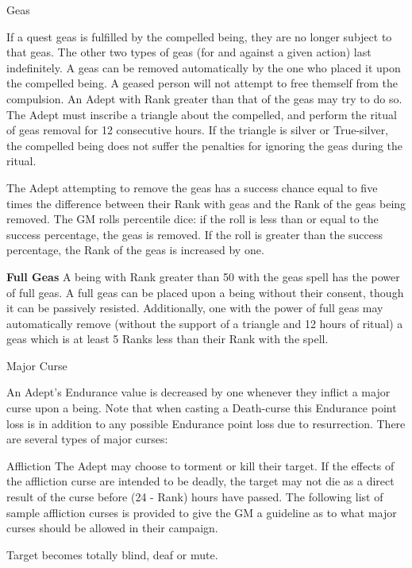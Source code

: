 \begin{multicols}{3}
\begin{spell}[]{Geas}
\begin{effects}
If a quest geas is fulfilled by the compelled being, they are no
longer subject to that geas.  The other two types of geas (for and
against a given action) last indefinitely.  A geas can be removed
automatically by the one who placed it upon the compelled being.  A
geased person will not attempt to free themself from the compulsion.
An Adept with Rank greater than that of the geas may try to do so.
The Adept must inscribe a triangle about the compelled, and perform
the ritual of geas removal for 12 consecutive hours.  If the triangle
is silver or True-silver, the compelled being does not suffer the
penalties for ignoring the geas during the ritual.

The Adept attempting to remove the geas has a success chance equal to
five times the difference between their Rank with geas and the Rank of
the geas being removed.  The GM rolls percentile dice: if the roll is
less than or equal to the success percentage, the geas is removed. If
the roll is greater than the success percentage, the Rank of the geas
is increased by one.

\textbf{Full Geas} A being with Rank greater than 50 with the geas
spell has the power of full geas. A full geas can be placed upon a
being without their consent, though it can be passively resisted.
Additionally, one with the power of full geas may automatically remove
(without the support of a triangle and 12 hours of ritual) a geas
which is at least 5 Ranks less than their Rank with the spell.
\end{effects}
\end{spell}

\begin{spell}[]{Major Curse}
\label{noncollege:majorcurse}

\begin{effects}
An Adept's Endurance value is decreased by one whenever they inflict a
major curse upon a being.  Note that when casting a Death-curse this
Endurance point loss is in addition to any possible Endurance point
loss due to resurrection.  There are several types of major curses:
\begin{Description}
\item[Affliction] The Adept may choose to torment or kill their
target. If the effects of the affliction curse are intended to be
deadly, the target may not die as a direct result of the curse before
(24 - Rank) hours have passed.  The following list of sample
affliction curses is provided to give the GM a guideline as to what
major curses should be allowed in their campaign.
\begin{Enumerate}
\setlength\itemsep{0pt}
\item
Target becomes totally blind, deaf or mute.


\end{Enumerate}
\end{Description}
\end{effects}
\end{spell}
\end{multicols}
